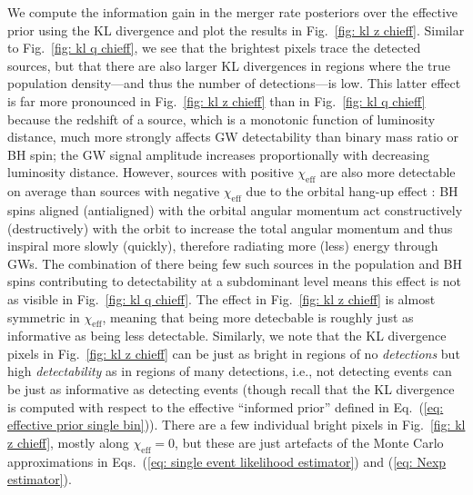 \begin{refsection}
We compute the information gain in the merger rate posteriors over the effective prior using the KL divergence and plot the results in Fig.~\ref{fig: kl z chieff}. Similar to Fig.~\ref{fig: kl q chieff}, we see that the brightest pixels trace the detected sources, but that there are also larger KL divergences in regions where the true population density---and thus the number of detections---is low. This latter effect is far more pronounced in Fig.~\ref{fig: kl z chieff} than in Fig.~\ref{fig: kl q chieff} because the redshift of a source, which is a monotonic function of luminosity distance, much more strongly affects GW detectability than binary mass ratio or BH spin; the GW signal amplitude increases proportionally with decreasing luminosity distance. However, sources with positive $\chi_\mathrm{eff}$ are also more detectable on average than sources with negative $\chi_\mathrm{eff}$ due to the orbital hang-up effect \cite{Damour:2001tu, Campanelli:2006uy, Scheel:2014ina}: BH spins aligned (antialigned) with the orbital angular momentum act constructively (destructively) with the orbit to increase the total angular momentum and thus inspiral more slowly (quickly), therefore radiating more (less) energy through GWs. The combination of there being few such sources in the population and BH spins contributing to detectability at a subdominant level means this effect is not as visible in Fig.~\ref{fig: kl q chieff}. The effect in Fig.~\ref{fig: kl z chieff} is almost symmetric in $\chi_\mathrm{eff}$, meaning that being more detecbable is roughly just as informative as being less detectable. Similarly, we note that the KL divergence pixels in Fig.~\ref{fig: kl z chieff} can be just as bright in regions of no \textit{detections} but high \textit{detectability} as in regions of many detections, i.e., not detecting events can be just as informative as detecting events (though recall that the KL divergence is computed with respect to the effective ``informed prior'' defined in Eq.~(\ref{eq: effective prior single bin})). There are a few individual bright pixels in Fig.~\ref{fig: kl z chieff}, mostly along $\chi_\mathrm{eff}=0$, but these are just artefacts of the Monte Carlo approximations in Eqs.~(\ref{eq: single event likelihood estimator}) and (\ref{eq: Nexp estimator}).


\end{refsection}
